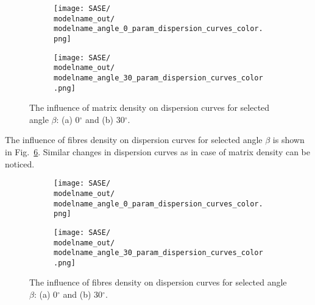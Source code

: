 \documentclass[preprint,12pt]{elsarticle}
\begin{document}
 \begin{figure} [h!]
 	\newcommand{\modelname}{SASE2_plain_weave}
 	\centering
 	\begin{subfigure}[b]{0.49\textwidth}
 		\centering
 		
 		
\texttt{[image: SASE/\\modelname\_out/\\modelname\_angle\_0\_param\_dispersion\_curves\_color.png]}
 		\caption{}
 		\label{fig:rhom0}
 	\end{subfigure}
 	\hfill
 	\begin{subfigure}[b]{0.49\textwidth}
 		\centering
 		
 		
\texttt{[image: SASE/\\modelname\_out/\\modelname\_angle\_30\_param\_dispersion\_curves\_color.png]}
 		\caption{}
 		\label{fig:rhom30}
 	\end{subfigure}

 	\caption{The influence of matrix density on dispersion curves for selected angle 
 	\(\beta\): (a) 0\(^{\circ}\) and (b) 30\(^{\circ}\).} 
 	\label{fig:rhom}
 \end{figure}
\clearpage

The influence of fibres density on dispersion curves for selected angle \(\beta\) is 
shown in Fig.~\ref{fig:rhof}. Similar changes in dispersion curves as in case of matrix 
density can be noticed.

\begin{figure} [h!]
	\centering
	\newcommand{\modelname}{SASE3_plain_weave}
	\begin{subfigure}[b]{0.49\textwidth}
		\centering
		
		
\texttt{[image: SASE/\\modelname\_out/\\modelname\_angle\_0\_param\_dispersion\_curves\_color.png]}
		\caption{}
		\label{fig:rhof0}
	\end{subfigure}
	\hfill
	\begin{subfigure}[b]{0.49\textwidth}
		\centering
		
		
\texttt{[image: SASE/\\modelname\_out/\\modelname\_angle\_30\_param\_dispersion\_curves\_color.png]}
		\caption{}
		\label{fig:rhof30}
	\end{subfigure}

	\caption{The influence of fibres density on dispersion curves for selected angle 
	\(\beta\): (a) 0\(^{\circ}\) and (b) 30\(^{\circ}\).} 
	\label{fig:rhof}
\end{figure}
\end{document}
